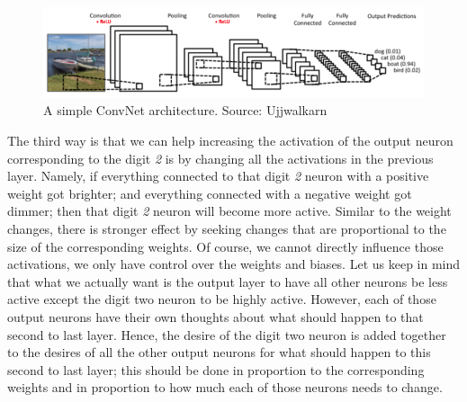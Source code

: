 \documentclass[master]{thesis-uestc}
\begin{document}
\begin{figure}[ht]
\includegraphics[width=5in]{pic/ConvNet_Arch.png}
\caption{A simple ConvNet architecture. Source: Ujjwalkarn}
\label{ConvNet_arch}
\end{figure}

The third way is that we can help increasing the activation of the output neuron corresponding to the digit \textit{2} is by changing all the activations in the previous layer. Namely, if everything connected to that digit \textit{2} neuron with a positive weight got brighter; and everything connected with a negative weight got dimmer; then that digit \textit{2} neuron will become more active. Similar to the weight changes, there is stronger effect by seeking changes that are proportional to the size of the corresponding weights. Of course, we cannot directly influence those activations, we only have control over the weights and biases. Let us keep in mind that what we actually want is the output layer to have all other neurons be less active except the digit two neuron to be highly active. However, each of those output neurons have their own thoughts about what should happen to that second to last layer. Hence, the desire of the digit two neuron is added together to the desires of all the other output neurons for what should happen to this second to last layer; this should be done in proportion to the corresponding weights and in proportion to how much each of those neurons needs to change.
\end{document}

